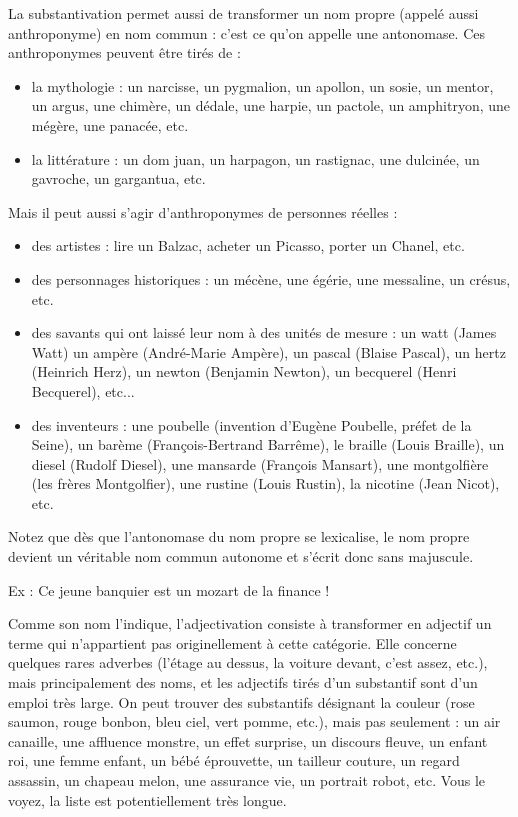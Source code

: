 La substantivation permet aussi de transformer un nom propre (appelé aussi anthroponyme) en nom commun : c’est ce qu’on appelle une antonomase. Ces anthroponymes peuvent être tirés de :
\begin{itemize}
\item la mythologie : un narcisse, un pygmalion, un apollon, un sosie, un mentor, un argus, une chimère, un dédale, une harpie, un pactole, un amphitryon, une mégère, une panacée, etc.
\item la littérature : un dom juan, un harpagon, un rastignac, une dulcinée, un gavroche, un gargantua, etc.
\end{itemize}
Mais il peut aussi s’agir d’anthroponymes de personnes réelles :
\begin{itemize}
\item des artistes : lire un Balzac, acheter un Picasso, porter un Chanel, etc.
\item des personnages historiques : un mécène, une égérie, une messaline, un crésus, etc.
\item des savants qui ont laissé leur nom à des unités de mesure : un watt (James Watt) un ampère (André-Marie Ampère), un pascal (Blaise Pascal), un hertz (Heinrich Herz), un newton (Benjamin Newton), un becquerel (Henri Becquerel), etc...
\item des inventeurs : une poubelle (invention d’Eugène Poubelle, préfet de la Seine), un barème (François-Bertrand Barrême), le braille (Louis Braille), un diesel (Rudolf Diesel), une mansarde (François Mansart), une montgolfière (les frères Montgolfier), une rustine (Louis Rustin), la nicotine (Jean Nicot), etc.
\end{itemize}
Notez que dès que l’antonomase du nom propre se lexicalise, le nom propre devient un véritable nom commun autonome et s’écrit donc sans majuscule.

Ex : Ce jeune banquier est un mozart de la finance !

Comme son nom l’indique, l’adjectivation consiste à transformer en adjectif un terme qui n’appartient pas originellement à cette catégorie. Elle concerne quelques rares adverbes (l’étage au dessus, la voiture devant, c’est assez, etc.), mais principalement des noms, et les adjectifs tirés d’un substantif sont d’un emploi très large. On peut trouver des substantifs désignant la couleur (rose saumon, rouge bonbon, bleu ciel, vert pomme, etc.), mais pas seulement : un air canaille, une affluence monstre, un effet surprise, un discours fleuve, un enfant roi, une femme enfant, un bébé éprouvette, un tailleur couture, un regard assassin, un chapeau melon, une assurance vie, un portrait robot, etc. Vous le voyez, la liste est potentiellement très longue.

